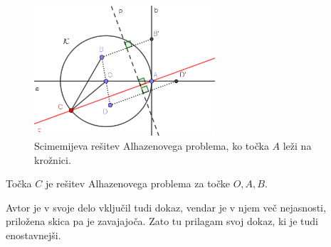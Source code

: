 \begin{figure}[h]
    \centering
    \includegraphics[width=0.6\textwidth]{images/alhazen/scimemi.png}
    \caption[Scimemijeva rešitev]{Scimemijeva rešitev Alhazenovega problema, ko točka $A$ leži na krožnici.}
    \label{fig:scimemi}
\end{figure}

\begin{trditev}
    Točka $C$ je rešitev Alhazenovega problema za točke $O, A, B$.
\end{trditev}
\begin{opomba}
    Avtor je v svoje delo vključil tudi dokaz, vendar je v njem več nejasnosti, priložena skica pa je zavajajoča. Zato tu prilagam svoj dokaz, ki je tudi enostavnejši.
\end{opomba}


